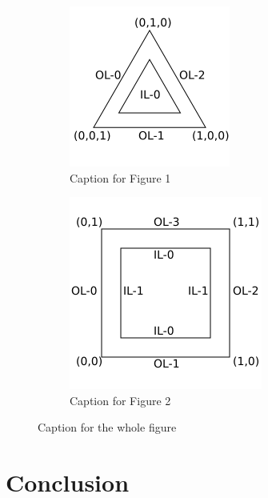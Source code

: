 \documentclass{report}
\begin{document}
\begin{figure}[h!]
	\centering
	\begin{subfigure}[h]{0.45\textwidth}
		\includegraphics[width=\textwidth]{img/triangle-patch.png}
		\caption{Caption for Figure 1}
		\label{fig:figure1}
	\end{subfigure}
	\hfill
	\begin{subfigure}[h]{0.45\textwidth}
		\includegraphics[width=\textwidth]{img/quad-patch.png}
		\caption{Caption for Figure 2}
		\label{fig:figure2}
	\end{subfigure}
	\caption{Caption for the whole figure}
	\label{fig:both_figures}
\end{figure}

\chapter{Conclusion}
\label{ch:conclusion}
\lipsum[7-8]



\end{document}
